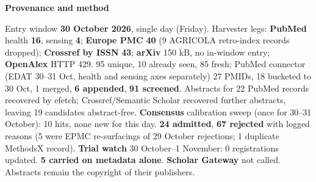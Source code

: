 \documentclass[10pt]{article}
\begin{document}


\vspace{2mm}

\begin{keybox}
{\sffamily\bfseries\footnotesize\color{Deep}Provenance and method}\\[1.2mm]
{\fontsize{7.2}{8.8}\selectfont
Entry window \textbf{30 October 2026}, single day (Friday). Harvester legs: \textbf{PubMed} health
\textbf{16}, sensing \textbf{4}; \textbf{Europe PMC} \textbf{40} (9 AGRICOLA retro-index records dropped);
\textbf{Crossref by ISSN} \textbf{43}; \textbf{arXiv} 150 kB, no in-window entry; \textbf{OpenAlex} HTTP 429. 95 unique,
10 already seen, 85 fresh; PubMed connector (EDAT 30--31 Oct, health and sensing axes separately) 27 PMIDs, 18 bucketed
to 30 Oct, 1 merged, \textbf{6 appended}, \textbf{91 screened}. Abstracts for 22 PubMed records recovered by efetch;
Crossref/Semantic Scholar recovered further abstracts, leaving 19 candidates abstract-free. \textbf{Consensus}
calibration sweep (once for 30--31 October): 10 hits, none new for this day. \textbf{24 admitted}, \textbf{67 rejected}
with logged reasons (5 were EPMC re-surfacings of 29 October rejections; 1 duplicate MethodsX record). \textbf{Trial
watch} 30 October--1 November: 0 registrations updated. \textbf{5 carried on metadata alone}. \textbf{Scholar Gateway}
not called. Abstracts remain the copyright of their publishers.\par}
\end{keybox}
\end{document}
